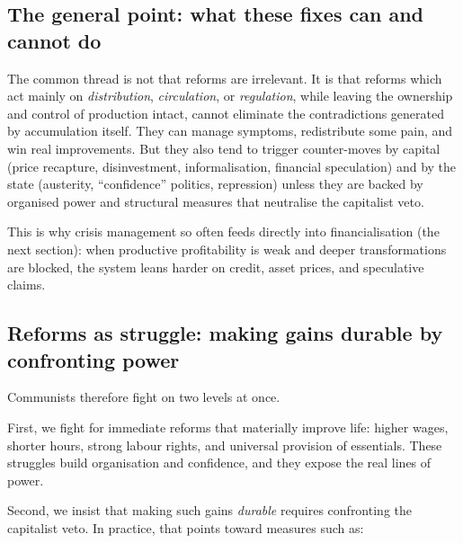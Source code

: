 \subsection{The general point: what these fixes can and cannot do}
\label{sec:policy-general-point}

The common thread is not that reforms are irrelevant. It is that reforms which act mainly on \emph{distribution},
\emph{circulation}, or \emph{regulation}, while leaving the ownership and control of production intact, cannot eliminate the
contradictions generated by accumulation itself. They can manage symptoms, redistribute some pain, and win real improvements.
But they also tend to trigger counter-moves by capital (price recapture, disinvestment, informalisation, financial speculation)
and by the state (austerity, ``confidence'' politics, repression) unless they are backed by organised power and structural
measures that neutralise the capitalist veto.

This is why crisis management so often feeds directly into financialisation (the next section): when productive profitability
is weak and deeper transformations are blocked, the system leans harder on credit, asset prices, and speculative claims.

\subsection{Reforms as struggle: making gains durable by confronting power}
\label{sec:reforms-as-struggle}

Communists therefore fight on two levels at once.

First, we fight for immediate reforms that materially improve life: higher wages, shorter hours, strong labour rights, and
universal provision of essentials. These struggles build organisation and confidence, and they expose the real lines of power.

Second, we insist that making such gains \emph{durable} requires confronting the capitalist veto. In practice, that points
toward measures such as:

